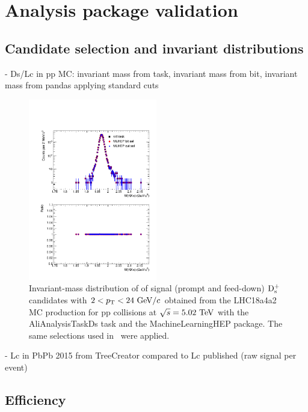 \section{Analysis package validation}
\label{sec:validation}

\subsection{Candidate selection and invariant distributions}
\label{subsec:invMassValidation}

- Ds/Lc in pp MC: invariant mass from task, invariant mass from bit, invariant mass from pandas applying standard cuts

\begin{figure}[tb]
\begin{center}
\includegraphics[width=0.5\textwidth]{figures/DsInvMassComparison.pdf}
\caption{Invariant-mass distribution of of signal (prompt and feed-down) $\rm D_s^+$ candidates with $2<p_{\rm T}<24~\mathrm{GeV}/c$ obtained from the LHC18a4a2 MC production for pp collisions at $\sqrt{s}=5.02~\mathrm{TeV}$ with the AliAnalysisTaskDs task and the MachineLearningHEP package. The same selections used in~\cite{Acharya:2019mgn} were applied.}
\label{fig:InvMassDsComparisonMCpp} 
\end{center}
\end{figure}

- Lc in PbPb 2015 from TreeCreator compared to Lc published (raw signal per event)

\subsection{Efficiency}
\label{subsec:effValidation}

